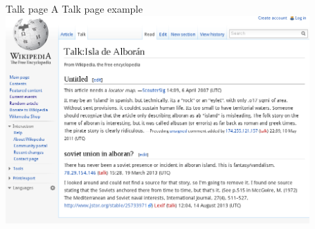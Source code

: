 \documentclass{beamer}
\begin{document}
\begin{frame} {Talk page}
	A Talk page example
	\includegraphics[height=7.8cm]{Talkpage.png}
\end{frame}
\end{document}
